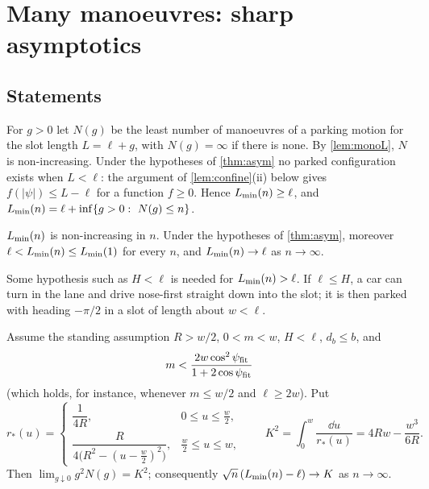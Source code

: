 \section{Many manoeuvres: sharp asymptotics}\label{sec:asym}

\subsection{Statements}
For $g>0$ let $N(g)$ be the least number of manoeuvres of a parking motion for the slot length $L=\ell+g$, with $N(g)=\infty$ if there is none.
By \cref{lem:monoL}, $N$ is non-increasing.
Under the hypotheses of \cref{thm:asym} no parked configuration exists when $L<\ell$: the argument of \cref{lem:confine}(ii) below gives $f(|\psi|)\le L-\ell$ for a function $f\ge0$.
Hence $L_{\min}(n)\ge\ell$, and $L_{\min}(n)=\ell+\inf\{g>0:\ N(g)\le n\}$.

\begin{theorem}\label{thm:mono}
$L_{\min}(n)$ is non-increasing in $n$.
Under the hypotheses of \cref{thm:asym}, moreover $\ell<L_{\min}(n)\le L_{\min}(1)$ for every $n$, and $L_{\min}(n)\to\ell$ as $n\to\infty$.
\end{theorem}

Some hypothesis such as $H<\ell$ is needed for $L_{\min}(n)>\ell$.
If $\ell\le H$, a car can turn in the lane and drive nose-first straight down into the slot; it is then parked with heading $-\pi/2$ in a slot of length about $w<\ell$.

\begin{theorem}\label{thm:asym}
Assume the standing assumption $R>w/2$, $0<m<w$, $H<\ell$, $d_b\le b$, and
\begin{equation}\label{eq:mcond}
  m<\frac{2w\cos^2\psi_{\rm fit}}{1+2\cos\psi_{\rm fit}}
\end{equation}
(which holds, for instance, whenever $m\le w/2$ and $\ell\ge2w$). Put
\[
  r_*(u)=\begin{cases}\dfrac1{4R}, & 0\le u\le \tfrac w2,\\[8pt] \dfrac{R}{4\big(R^2-(u-\frac w2)^2\big)}, & \tfrac w2\le u\le w,\end{cases}
  \qquad K^2=\int_0^w\frac{\dd u}{r_*(u)}=4Rw-\frac{w^3}{6R}.
\]
Then $\lim_{g\downarrow0}g^2N(g)=K^2$; consequently $\sqrt n\,(L_{\min}(n)-\ell)\to K$ as $n\to\infty$.
\end{theorem}

